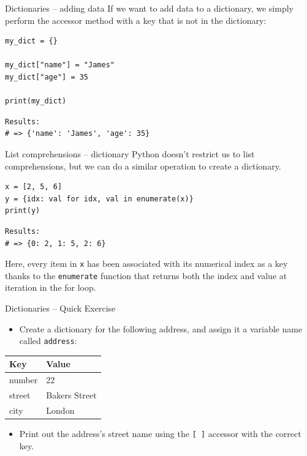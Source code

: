 \documentclass[10pt]{beamer}
\begin{document}
\begin{frame}[label={sec:org1cf46bf},fragile]{Dictionaries -- adding data}
 If we want to add data to a dictionary, we simply perform the accessor method with a
key that is not in the dictionary:

\begin{verbatim}
my_dict = {}

my_dict["name"] = "James"
my_dict["age"] = 35

print(my_dict)
\end{verbatim}

\begin{verbatim}
Results: 
# => {'name': 'James', 'age': 35}
\end{verbatim}
\end{frame}

\begin{frame}[label={sec:org303b2ff},fragile]{List comprehensions -- dictionary}
 Python doesn't restrict us to list comprehensions, but we can do a similar
operation to create a dictionary.

\begin{verbatim}
x = [2, 5, 6]
y = {idx: val for idx, val in enumerate(x)}
print(y)
\end{verbatim}

\begin{verbatim}
Results: 
# => {0: 2, 1: 5, 2: 6}
\end{verbatim}


Here, every item in \texttt{x} has been associated with its numerical index as a key thanks to
the \texttt{enumerate} function that returns both the index and value at iteration in the for loop.
\end{frame}

\begin{frame}[label={sec:org741208a},fragile]{Dictionaries -- Quick Exercise}
 \begin{itemize}
\item Create a dictionary for the following address, and assign it a variable name
called \texttt{address}:
\end{itemize}

\begin{center}
\begin{tabular}{ll}
\toprule
Key & Value\\
\midrule
number & 22\\
street & Bakers Street\\
city & London\\
\bottomrule
\end{tabular}
\end{center}

\begin{itemize}
\item Print out the address's street name using the \texttt{[ ]} accessor with the correct key.
\end{itemize}
\end{frame}
\end{document}
